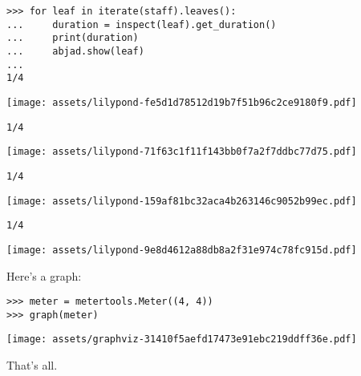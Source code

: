 \documentclass{article}
\begin{document}
\begin{lstlisting}
>>> for leaf in iterate(staff).leaves():
...     duration = inspect(leaf).get_duration()
...     print(duration)
...     abjad.show(leaf)
...
1/4
\end{lstlisting}
\noindent\texttt{[image: assets/lilypond-fe5d1d78512d19b7f51b96c2ce9180f9.pdf]}
\begin{lstlisting}
1/4
\end{lstlisting}
\noindent\texttt{[image: assets/lilypond-71f63c1f11f143bb0f7a2f7ddbc77d75.pdf]}
\begin{lstlisting}
1/4
\end{lstlisting}
\noindent\texttt{[image: assets/lilypond-159af81bc32aca4b263146c9052b99ec.pdf]}
\begin{lstlisting}
1/4
\end{lstlisting}
\noindent\texttt{[image: assets/lilypond-9e8d4612a88db8a2f31e974c78fc915d.pdf]}

Here's a graph:

\begin{comment}
<abjad>
meter = metertools.Meter((4, 4))
graph(meter)
</abjad>
\end{comment}

\begin{lstlisting}
>>> meter = metertools.Meter((4, 4))
>>> graph(meter)
\end{lstlisting}
\noindent\texttt{[image: assets/graphviz-31410f5aefd17473e91ebc219ddff36e.pdf]}

That's all.
\end{document}
